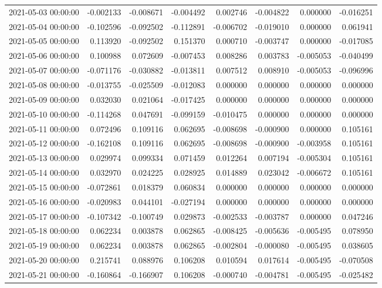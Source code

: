 \begin{tabular}{lrrrrrrr}
2021-05-03 00:00:00 & -0.002133 & -0.008671 & -0.004492 & 0.002746 & -0.004822 & 0.000000 & -0.016251 \\
2021-05-04 00:00:00 & -0.102596 & -0.092502 & -0.112891 & -0.006702 & -0.019010 & 0.000000 & 0.061941 \\
2021-05-05 00:00:00 & 0.113920 & -0.092502 & 0.151370 & 0.000710 & -0.003747 & 0.000000 & -0.017085 \\
2021-05-06 00:00:00 & 0.100988 & 0.072609 & -0.007453 & 0.008286 & 0.003783 & -0.005053 & -0.040499 \\
2021-05-07 00:00:00 & -0.071176 & -0.030882 & -0.013811 & 0.007512 & 0.008910 & -0.005053 & -0.096996 \\
2021-05-08 00:00:00 & -0.013755 & -0.025509 & -0.012083 & 0.000000 & 0.000000 & 0.000000 & 0.000000 \\
2021-05-09 00:00:00 & 0.032030 & 0.021064 & -0.017425 & 0.000000 & 0.000000 & 0.000000 & 0.000000 \\
2021-05-10 00:00:00 & -0.114268 & 0.047691 & -0.099159 & -0.010475 & 0.000000 & 0.000000 & 0.000000 \\
2021-05-11 00:00:00 & 0.072496 & 0.109116 & 0.062695 & -0.008698 & -0.000900 & 0.000000 & 0.105161 \\
2021-05-12 00:00:00 & -0.162108 & 0.109116 & 0.062695 & -0.008698 & -0.000900 & -0.003958 & 0.105161 \\
2021-05-13 00:00:00 & 0.029974 & 0.099334 & 0.071459 & 0.012264 & 0.007194 & -0.005304 & 0.105161 \\
2021-05-14 00:00:00 & 0.032970 & 0.024225 & 0.028925 & 0.014889 & 0.023042 & -0.006672 & 0.105161 \\
2021-05-15 00:00:00 & -0.072861 & 0.018379 & 0.060834 & 0.000000 & 0.000000 & 0.000000 & 0.000000 \\
2021-05-16 00:00:00 & -0.020983 & 0.044101 & -0.027194 & 0.000000 & 0.000000 & 0.000000 & 0.000000 \\
2021-05-17 00:00:00 & -0.107342 & -0.100749 & 0.029873 & -0.002533 & -0.003787 & 0.000000 & 0.047246 \\
2021-05-18 00:00:00 & 0.062234 & 0.003878 & 0.062865 & -0.008425 & -0.005636 & -0.005495 & 0.078950 \\
2021-05-19 00:00:00 & 0.062234 & 0.003878 & 0.062865 & -0.002804 & -0.000080 & -0.005495 & 0.038605 \\
2021-05-20 00:00:00 & 0.215741 & 0.088976 & 0.106208 & 0.010594 & 0.017614 & -0.005495 & -0.070508 \\
2021-05-21 00:00:00 & -0.160864 & -0.166907 & 0.106208 & -0.000740 & -0.004781 & -0.005495 & -0.025482 \\

\end{tabular}
